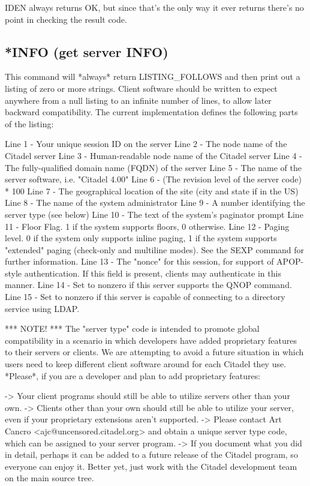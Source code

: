  IDEN always returns OK, but since that's the only way it ever returns
there's no point in checking the result code.



\subsection{*INFO (get server INFO)}

 This command will *always* return LISTING_FOLLOWS and then print out a
listing of zero or more strings.  Client software should be written to expect
anywhere from a null listing to an infinite number of lines, to allow later
backward compatibility.  The current implementation defines the following
parts of the listing:

 Line 1  - Your unique session ID on the server
 Line 2  - The node name of the Citadel server
 Line 3  - Human-readable node name of the Citadel server
 Line 4  - The fully-qualified domain name (FQDN) of the server
 Line 5  - The name of the server software, i.e. "Citadel 4.00"
 Line 6  - (The revision level of the server code) * 100
 Line 7  - The geographical location of the site (city and state if in the US)
 Line 8  - The name of the system administrator
 Line 9  - A number identifying the server type (see below)
 Line 10 - The text of the system's paginator prompt
 Line 11 - Floor Flag.  1 if the system supports floors, 0 otherwise.
 Line 12 - Paging level.  0 if the system only supports inline paging,
           1 if the system supports "extended" paging (check-only and
           multiline modes).  See the SEXP command for further information.
 Line 13 - The "nonce" for this session, for support of APOP-style
           authentication.  If this field is present, clients may authenticate
           in this manner.
 Line 14 - Set to nonzero if this server supports the QNOP command.
 Line 15 - Set to nonzero if this server is capable of connecting to a
           directory service using LDAP.

 *** NOTE! ***   The "server type" code is intended to promote global
compatibility in a scenario in which developers have added proprietary
features to their servers or clients.  We are attempting to avoid a future
situation in which users need to keep different client software around for
each Citadel they use.  *Please*, if you are a developer and plan to add
proprietary features:

 -> Your client programs should still be able to utilize servers other than
your own.
 -> Clients other than your own should still be able to utilize your server,
even if your proprietary extensions aren't supported.
 -> Please contact Art Cancro <ajc@uncensored.citadel.org> and obtain a unique
server type code, which can be assigned to your server program.
 -> If you document what you did in detail, perhaps it can be added to a
future release of the Citadel program, so everyone can enjoy it.  Better
yet, just work with the Citadel development team on the main source tree.

